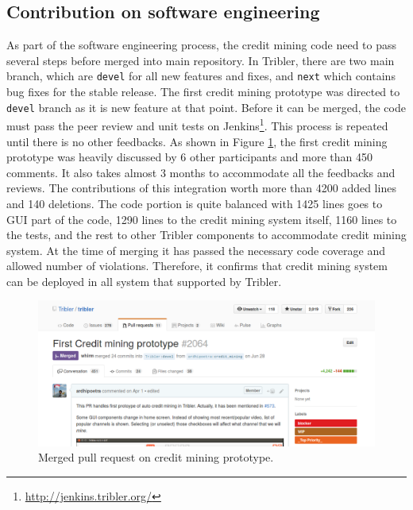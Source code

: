 \subsection{Contribution on software engineering}
As part of the software engineering process, the credit mining code need to pass several steps before merged into main repository. In Tribler, there are two main branch, which are \texttt{devel} for all new features and fixes, and \texttt{next} which contains bug fixes for the stable release. The first credit mining prototype was directed to \texttt{devel} branch as it is new feature at that point. Before it can be merged, the code must pass the peer review and unit tests on Jenkins\footnote{\url{http://jenkins.tribler.org/}}. This process is repeated until there is no other feedbacks. As shown in Figure \ref{fig:cmpullrequest}, the first credit mining prototype was heavily discussed by 6 other participants and more than 450 comments. It also takes almost 3 months to accommodate all the feedbacks and reviews. The contributions of this integration worth more than 4200 added lines and 140 deletions. The code portion is quite balanced with 1425 lines goes to GUI part of the code, 1290 lines to the credit mining system itself, 1160 lines to the tests, and the rest to other Tribler components to accommodate credit mining system. At the time of merging it has passed the necessary code coverage and allowed number of violations. Therefore, it confirms that credit mining system can be deployed in all system that supported by Tribler. 

\begin{figure}[h]
	\centering
	\includegraphics[width=\textwidth]{pics/cm_pr_crop.png}
	\caption[Merged pull request on credit mining prototype]{Merged pull request on credit mining prototype\footnotemark.}
	\label{fig:cmpullrequest}
\end{figure}

